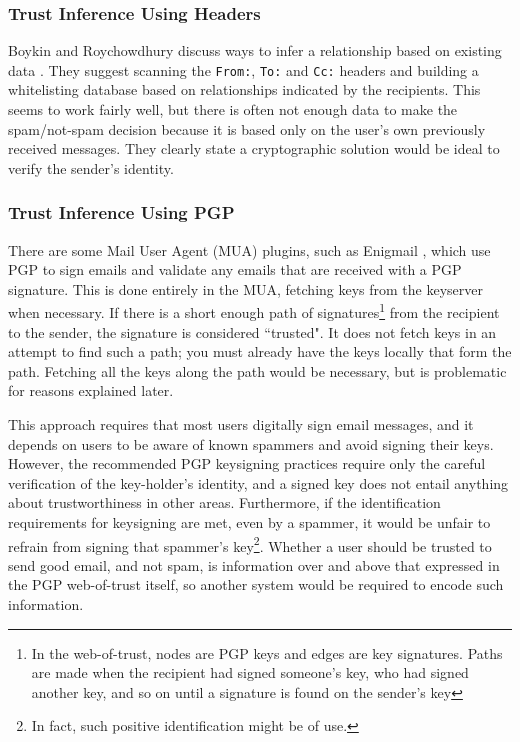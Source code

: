 \documentclass[letterpaper]{www2006-submission}
\begin{document}
\subsubsection{Trust Inference Using Headers}
Boykin and Roychowdhury discuss ways to infer a relationship based on existing data \citep{boykin04email}.  They suggest scanning the \texttt{From:}, \texttt{To:} and \texttt{Cc:} headers and building a whitelisting database based on relationships indicated by the recipients.  This seems to work fairly well, but there is often not enough data to make the spam/not-spam decision because it is based only on the user's own previously received messages. They clearly state a cryptographic solution would be ideal to verify the sender's identity.

\subsubsection{Trust Inference Using PGP}
\label{earlierPGP}
There are some Mail User Agent (MUA) plugins, such as Enigmail \citep{enigmail}, which use PGP to sign emails and validate any emails that are received with a PGP signature.  This is done entirely in the MUA, fetching keys from the keyserver when necessary.  If there is a short enough path of signatures\footnote{In the web-of-trust, nodes are PGP keys and edges are key signatures.  Paths are made when the recipient had signed someone's key, who had signed another key, and so on until a signature is found on the sender's key} from the recipient to the sender, the signature is considered ``trusted".  It does not fetch keys in an attempt to find such a path; you must already have the keys locally that form the path.  Fetching all the keys along the path would be necessary, but is problematic for reasons explained later.

This approach requires that most users digitally sign email messages, and it depends on users to be aware of known spammers and avoid signing their keys. However, the recommended PGP keysigning practices require only the careful verification of the key-holder's identity, and a signed key does not entail anything about trustworthiness in other areas.  Furthermore, if the identification requirements for keysigning are met, even by a spammer, it would be unfair to refrain from signing that spammer's key\footnote{In fact, such positive identification might be of use.}.  Whether a user should be trusted to send good email, and not spam, is information over and above that expressed in the PGP web-of-trust itself, so another system would be required to encode such information.
\end{document}
